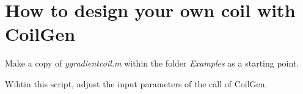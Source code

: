 \documentclass[a4paper,12pt]{book}
\begin{document}
\section{How to design your own coil with CoilGen}

Make a copy of \textit{y\textunderscore gradient\textunderscore coil.m} within the folder \textit{Examples} as a starting point. 

Wihtin this script, adjust the input parameters of the call of CoilGen. 
\end{document}
